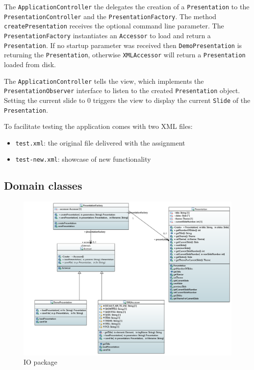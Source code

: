 \documentclass[a4paper]{article}
\begin{document}
The \texttt{ApplicationController} the delegates the creation of a \texttt{Presentation} to the \texttt{PresentationController} and the \texttt{PresentationFactory}. The method \texttt{createPresentation}  receives the optional command line parameter. The \texttt{PresentationFactory} instantiates an \texttt{Accessor} to load and return a \texttt{Presentation}. If no startup parameter was received then \texttt{DemoPresentation} is returning the \texttt{Presentation}, otherwise \texttt{XMLAccessor} will return a \texttt{Presentation} loaded from disk.

The \texttt{ApplicationController} tells the view, which implements the \texttt{PresentationObserver} interface to listen to the created \texttt{Presentation} object. Setting the current slide to 0 triggers the view to display the current \texttt{Slide} of the \texttt{Presentation}.

To facilitate testing the application comes with two XML files: 
\begin{itemize}
\item \texttt{test.xml}: the original file delivered with the assignment
\item \texttt{test-new.xml}: showcase of new functionality
\end{itemize}

\subsection{Domain classes}
\begin{figure}[!htpb]
  \includegraphics[width=\linewidth]{IO.png}
  \caption{IO package}
  \label{fig:packdiag}
\end{figure}
\end{document}
